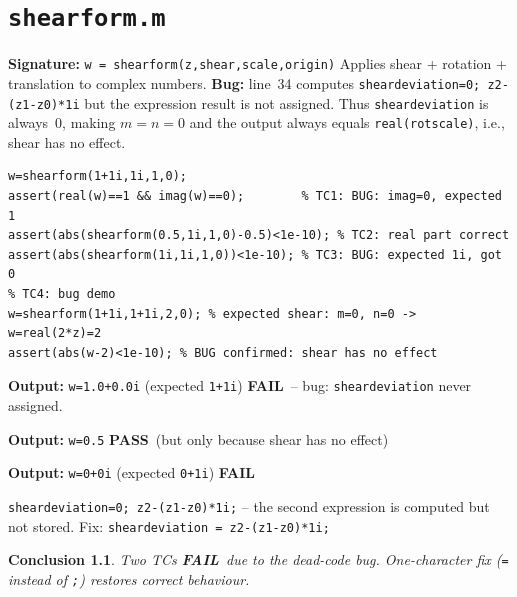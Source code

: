 \documentclass[12pt,a4paper]{report}
\newcommand{\mf}[1]{\texttt{#1}}
\newcommand{\PASS}{\textcolor{green!60!black}{\textbf{PASS}}}
\newcommand{\FAIL}{\textcolor{red!70!black}{\textbf{FAIL}}}
\newtheorem{concl}{Conclusion}[chapter]
\begin{document}
\chapter{\mf{shearform.m}}
\begin{tcolorbox}[Abox,title=Analysis]
\textbf{Signature:} \lstinline|w = shearform(z,shear,scale,origin)|\quad
Applies shear + rotation + translation to complex numbers. \textbf{Bug:} line~34 computes \lstinline|sheardeviation=0; z2-(z1-z0)*1i| but the expression result is not assigned. Thus \mf{sheardeviation} is always~0, making $m=n=0$ and the output always equals \mf{real(rotscale)}, i.e., shear has no effect.
\end{tcolorbox}
\begin{lstlisting}[caption={Tests for shearform.m -- with bug demonstration}]
w=shearform(1+1i,1i,1,0);
assert(real(w)==1 && imag(w)==0);        % TC1: BUG: imag=0, expected 1
assert(abs(shearform(0.5,1i,1,0)-0.5)<1e-10); % TC2: real part correct
assert(abs(shearform(1i,1i,1,0))<1e-10); % TC3: BUG: expected 1i, got 0
% TC4: bug demo
w=shearform(1+1i,1+1i,2,0); % expected shear: m=0, n=0 -> w=real(2*z)=2
assert(abs(w-2)<1e-10); % BUG confirmed: shear has no effect
\end{lstlisting}
\begin{tcolorbox}[Fbox,title=TC1 -- Imaginary part lost]
\textbf{Output:} \texttt{w=1.0+0.0i} (expected \texttt{1+1i}) \quad \FAIL\ -- bug: \mf{sheardeviation} never assigned.
\end{tcolorbox}
\begin{tcolorbox}[Pbox,title=TC2 -- Real part correct]
\textbf{Output:} \texttt{w=0.5} \quad \PASS\ (but only because shear has no effect)
\end{tcolorbox}
\begin{tcolorbox}[Fbox,title=TC3 -- Pure imaginary input]
\textbf{Output:} \texttt{w=0+0i} (expected \texttt{0+1i}) \quad \FAIL
\end{tcolorbox}
\begin{tcolorbox}[Bbox,title=Bug: Dead Code on Line 34]
\lstinline|sheardeviation=0; z2-(z1-z0)*1i;| -- the second expression is computed but not stored. Fix: \lstinline|sheardeviation = z2-(z1-z0)*1i;|
\end{tcolorbox}
\begin{concl}
Two TCs \FAIL\ due to the dead-code bug. One-character fix (\texttt{=} instead of \texttt{;}) restores correct behaviour.
\end{concl}
\end{document}
